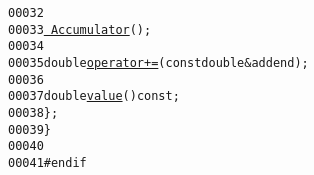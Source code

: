 \begin{footnotesize}
\begin{alltt}
00032 
00033             \hyperlink{classeos_1_1Accumulator_a8f9265ed73251d2921cdf50733d494e6}{~Accumulator}();
00034 
00035             \textcolor{keywordtype}{double} \hyperlink{classeos_1_1Accumulator_a8cbd4477f50751394afc7c445640de79}{operator+= }(\textcolor{keyword}{const} \textcolor{keywordtype}{double} & addend);
00036 
00037             \textcolor{keywordtype}{double} \hyperlink{classeos_1_1Accumulator_a6fc737db7b42656c0435c9d6cedb62b0}{value}() \textcolor{keyword}{const};
00038     \};
00039 \}
00040 
00041 \textcolor{preprocessor}{#endif}
\end{alltt}\end{footnotesize}
